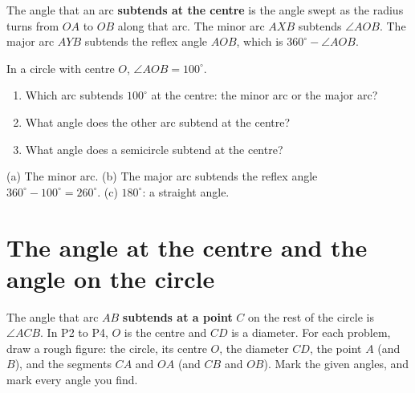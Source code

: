 The angle that an arc \textbf{subtends at the centre} is the angle swept as the radius turns from $OA$ to $OB$ along that arc. The minor arc $AXB$ subtends $\angle AOB$. The major arc $AYB$ subtends the reflex angle $AOB$, which is $360^\circ-\angle AOB$.

\begin{solvefirst}
  \item In a circle with centre $O$, $\angle AOB=100^\circ$.
  \begin{enumerate}[label=(\alph*),itemsep=1pt]
    \item Which arc subtends $100^\circ$ at the centre: the minor arc or the major arc?
    \item What angle does the other arc subtend at the centre?
    \item What angle does a semicircle subtend at the centre?
  \end{enumerate}
\end{solvefirst}

\begin{answerblock}
(a) The minor arc. (b) The major arc subtends the reflex angle $360^\circ-100^\circ=260^\circ$. (c) $180^\circ$: a straight angle.
\end{answerblock}

\section{The angle at the centre and the angle on the circle}

The angle that arc $AB$ \textbf{subtends at a point} $C$ on the rest of the circle is $\angle ACB$. In P2 to P4, $O$ is the centre and $CD$ is a diameter. For each problem, draw a rough figure: the circle, its centre $O$, the diameter $CD$, the point $A$ (and $B$), and the segments $CA$ and $OA$ (and $CB$ and $OB$). Mark the given angles, and mark every angle you find.

